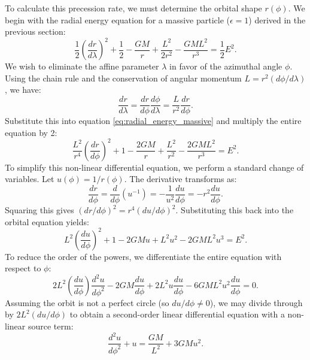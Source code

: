 \documentclass[11pt, a4paper]{report}
\begin{document}
To calculate this precession rate, we must determine the orbital shape $r(\phi)$. We begin with the radial energy equation for a massive particle ($\epsilon = 1$) derived in the previous section:
\begin{equation}
\label{eq:radial_energy_massive}
\frac{1}{2}\left(\frac{dr}{d\lambda}\right)^{2} + \frac{1}{2} - \frac{GM}{r} + \frac{L^{2}}{2r^{2}} - \frac{GML^{2}}{r^{3}} = \frac{1}{2}E^{2}.
\end{equation}
We wish to eliminate the affine parameter $\lambda$ in favor of the azimuthal angle $\phi$. Using the chain rule and the conservation of angular momentum $L = r^{2}(d\phi/d\lambda)$, we have:
\begin{equation}
\frac{dr}{d\lambda} = \frac{dr}{d\phi}\frac{d\phi}{d\lambda} = \frac{L}{r^{2}}\frac{dr}{d\phi}.
\end{equation}
Substitute this into equation \eqref{eq:radial_energy_massive} and multiply the entire equation by 2:
\begin{equation}
\frac{L^{2}}{r^{4}}\left(\frac{dr}{d\phi}\right)^{2} + 1 - \frac{2GM}{r} + \frac{L^{2}}{r^{2}} - \frac{2GML^{2}}{r^{3}} = E^{2}.
\end{equation}
To simplify this non-linear differential equation, we perform a standard change of variables. Let $u(\phi) = 1/r(\phi)$. The derivative transforms as:
\begin{equation}
\frac{dr}{d\phi} = \frac{d}{d\phi}\left(u^{-1}\right) = -\frac{1}{u^{2}}\frac{du}{d\phi} = -r^{2}\frac{du}{d\phi}.
\end{equation}
Squaring this gives $(dr/d\phi)^{2} = r^{4}(du/d\phi)^{2}$. Substituting this back into the orbital equation yields:
\begin{equation}
L^{2}\left(\frac{du}{d\phi}\right)^{2} + 1 - 2GMu + L^{2}u^{2} - 2GML^{2}u^{3} = E^{2}.
\end{equation}
To reduce the order of the powers, we differentiate the entire equation with respect to $\phi$:
\begin{equation}
2L^{2}\left(\frac{du}{d\phi}\right)\frac{d^{2}u}{d\phi^{2}} - 2GM\frac{du}{d\phi} + 2L^{2}u\frac{du}{d\phi} - 6GML^{2}u^{2}\frac{du}{d\phi} = 0.
\end{equation}
Assuming the orbit is not a perfect circle (so $du/d\phi \neq 0$), we may divide through by $2L^{2}(du/d\phi)$ to obtain a second-order linear differential equation with a non-linear source term:
\begin{equation}
\frac{d^{2}u}{d\phi^{2}} + u = \frac{GM}{L^{2}} + 3GMu^{2}.
\end{equation}
\end{document}
